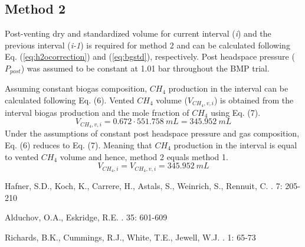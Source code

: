 \documentclass[]{article}
\begin{document}
\subsection{Method 2}
Post-venting dry and standardized volume for current interval (\textit{i}) and the previous interval (\textit{i-1}) is required for method 2 and can be calculated following Eq. (\ref{eq:h2ocorrection}) and (\ref{eq:bgstd}), respectively. Post headspace pressure ($P_{post}$) was assumed to be constant at 1.01 bar throughout the BMP trial. 

Assuming constant biogas composition, $CH_{4}$ production in the interval can be calculated following Eq. (6). 
Vented $CH_{4}$ volume ($V_{CH_4, v,i}$) is obtained from the interval biogas production and the mole fraction of $CH_{4}$ using Eq. (7).
\begin{equation*}
  V_{CH_4, v, i} = 0.672 \cdot 551.758\ mL  = 345.952\ mL 
\end{equation*}
Under the assumptions of constant post headspace pressure and gas composition,  Eq. (6) reduces to Eq. (7). Meaning that $CH_{4}$ production in the interval is equal to vented $CH_{4}$ volume and hence, method 2 equals method 1. 
\begin{equation*}
  V_{CH_4, i} = V_{CH_4, v, i} = 345.952\ mL    
\end{equation*}


\begin{thebibliography}{1}

Hafner, S.D., Koch, K., Carrere, H., Astals, S., Weinrich, S., Rennuit, C.
    . 
     7: 205-210

Alduchov, O.A., Eskridge, R.E.    
    . 
     35: 601-609

Richards, B.K., Cummings, R.J., White, T.E., Jewell, W.J.    
    . 
     1: 65-73

\end{thebibliography}


%
\end{document}
